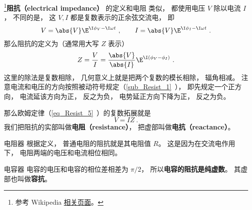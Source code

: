 
\begin{issues}
\issueDraft
\end{issues}


\footnote{参考 Wikipedia \href{https://en.wikipedia.org/wiki/Electrical_impedance}{相关页面}。}\textbf{阻抗（electrical impedance）} 的定义和电阻 类似， 都使用电压 $V$ 除以电流 $I$， 不同的是， 这 $V, I$ 都是复数表示的正余弦交流电， 即
\begin{equation}
V = \abs{V} \E^{\I \phi_V - \I \omega t}~,
\qquad
I = \abs{V} \E^{\I \phi_I - \I \omega t}~.
\end{equation}
那么阻抗的定义为（通常用大写 $Z$ 表示）
\begin{equation}
Z = \frac{V}{I} = \frac{\abs{V}}{\abs{I}} \E^{\I (\phi_V - \phi_I)}~.
\end{equation}
这里的除法是复数相除， 几何意义上就是把两个复数的模长相除， 辐角相减。 注意电流和电压的方向按照被动符号规定（\autoref{sub_Resist_1}~）， 即先规定一个正方向， 电流延该方向为正， 反之为负， 电势延正方向下降为正， 反之为负。

那么欧姆定律（\autoref{eq_Resist_5}~）的复数拓展就是
\begin{equation}
V = IZ~.
\end{equation}
我们把阻抗的实部叫做\textbf{电阻（resistance）}， 把虚部叫做\textbf{电抗（reactance）}。

\begin{example}{电阻器}\label{ex_impeda_1}
根据定义， 普通电阻的阻抗就是其电阻值 $R$。 这是因为在交流电作用下， 电阻两端的电压和电流相位相同。
\end{example}

\begin{example}{电容器}
电容的电压和电容的相位差相差为 $\pi/2$， 所以\textbf{电容的阻抗是纯虚数}。 其虚部也叫做\textbf{容抗}。
\end{example}
